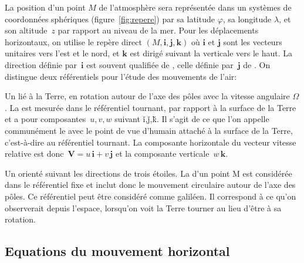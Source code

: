 \sk
La position d'un point $M$ de l'atmosphère sera représentée dans un systèmes de coordonnées sphériques (figure~\ref{fig:repere}) par sa latitude $\varphi$, sa longitude $\lambda$, et son altitude~$z$ par rapport au niveau de la mer. Pour les déplacements horizontaux, on utilise le repère direct
$\left(M,\mathbf{i},\mathbf{j},\mathbf{k}\right)$ où $\mathbf{i}$ et $\mathbf{j}$ sont les vecteurs unitaires vers l'est et le nord, et $\mathbf{k}$ est dirigé suivant la verticale vers le haut. La direction définie par~$\mathbf{i}$ est souvent qualifiée de , celle définie par~$\mathbf{j}$ de . 
%
On distingue deux référentiels pour l'étude des mouvements de l'air:
\begin{finger}
\item Un  lié à la Terre, en rotation autour de l'axe des pôles avec la vitesse angulaire $\Omega$. La  est mesurée dans le référentiel tournant, par rapport à la surface de la Terre et a pour composantes~$u,v,w$ suivant \v i,\v j,\v k. Il s'agit de ce que l'on appelle communément le  avec le point de vue d'humain attaché à la surface de la Terre, c'est-à-dire au référentiel tournant. La composante horizontale du vecteur vitesse relative est donc~$\mathbf{V} = u \, \mathbf{i} + v \, \mathbf{j}$ et la composante verticale~$w \, \mathbf{k}$.
\item Un  orienté suivant les directions de trois étoiles. La  d'un point M est considérée dans le référentiel fixe et inclut donc le mouvement circulaire autour de l'axe des pôles. Ce référentiel peut être considéré comme galiléen. Il correspond à ce qu'on observerait depuis l'espace, lorsqu'on voit la Terre tourner au lieu d'être  à sa rotation.
\end{finger}


\sk
\subsection{Equations du mouvement horizontal}

